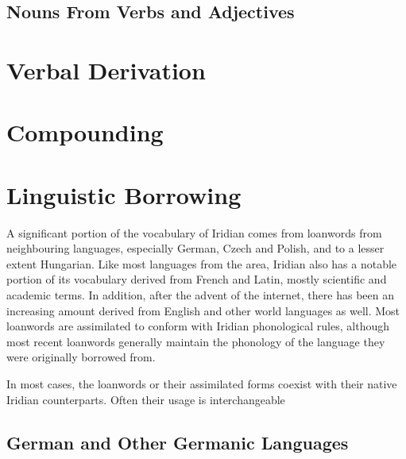\subsection{Nouns From Verbs and Adjectives}
\section{Verbal Derivation}

\section{Compounding}\label{sec:compounding}

\section{Linguistic Borrowing}
A significant portion of the vocabulary of Iridian comes from loanwords from neighbouring languages, especially German, Czech and Polish, and to a lesser extent Hungarian. Like most languages from the area, Iridian also has a notable portion of its vocabulary derived from French and Latin, mostly scientific and academic terms. In addition, after the advent of the internet, there has been an increasing amount derived from English and other world languages as well. Most loanwords are assimilated to conform with Iridian phonological rules, although most recent loanwords generally maintain the phonology of the language they were originally borrowed from.

In most cases, the loanwords or their assimilated forms coexist with their native Iridian counterparts. Often their usage is interchangeable

\subsection{German and Other Germanic Languages}

